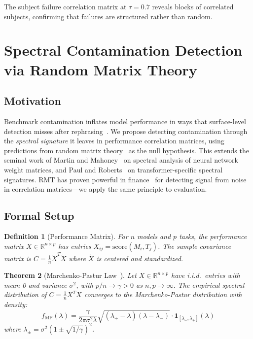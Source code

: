 \documentclass[11pt]{article}
\newtheorem{theorem}{Theorem}[section]
\newtheorem{definition}[theorem]{Definition}
\newcommand{\R}{\mathbb{R}}
\begin{document}
The subject failure correlation matrix at $\tau = 0.7$ reveals blocks of correlated subjects, confirming that failures are structured rather than random.

\section{Spectral Contamination Detection via Random Matrix Theory}
\label{sec:spectral}

\subsection{Motivation}

Benchmark contamination inflates model performance in ways that surface-level detection misses after rephrasing~\cite{yang2023rethinking}. We propose detecting contamination through the \emph{spectral signature} it leaves in performance correlation matrices, using predictions from random matrix theory~\cite{mehta2004random,anderson2003introduction} as the null hypothesis. This extends the seminal work of Martin and Mahoney~\cite{martin2018implicit} on spectral analysis of neural network weight matrices, and Paul and Roberts~\cite{paulroberts2024spectral} on transformer-specific spectral signatures. RMT has proven powerful in finance~\cite{bouchaud2009random} for detecting signal from noise in correlation matrices---we apply the same principle to evaluation.

\subsection{Formal Setup}

\begin{definition}[Performance Matrix]
For $n$ models and $p$ tasks, the \emph{performance matrix} $X \in \R^{n \times p}$ has entries $X_{ij} = \text{score}(M_i, T_j)$. The \emph{sample covariance matrix} is $C = \frac{1}{n} \tilde{X}^T \tilde{X}$ where $\tilde{X}$ is centered and standardized.
\end{definition}

\begin{theorem}[Marchenko-Pastur Law~\cite{marchenkopastur1967}]
\label{thm:mp}
Let $X \in \R^{n \times p}$ have i.i.d.\ entries with mean 0 and variance $\sigma^2$, with $p/n \to \gamma > 0$ as $n, p \to \infty$. The empirical spectral distribution of $C = \frac{1}{n}X^T X$ converges to the Marchenko-Pastur distribution with density:
\begin{equation}
f_{\mathrm{MP}}(\lambda) = \frac{\gamma}{2\pi\sigma^2 \lambda} \sqrt{(\lambda_+ - \lambda)(\lambda - \lambda_-)} \cdot \mathbf{1}_{[\lambda_-, \lambda_+]}(\lambda)
\end{equation}
where $\lambda_\pm = \sigma^2(1 \pm \sqrt{1/\gamma})^2$.
\end{theorem}
\end{document}
